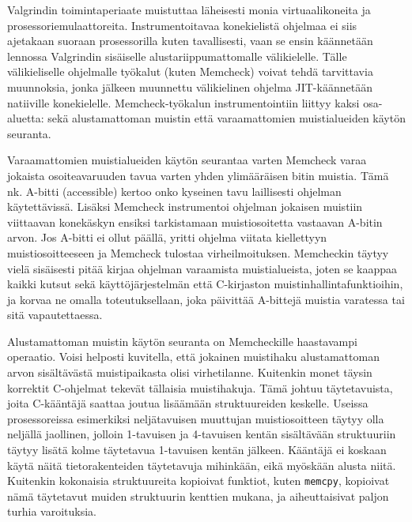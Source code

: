 Valgrindin toimintaperiaate muistuttaa läheisesti monia virtuaalikoneita ja prosessoriemulaattoreita.
Instrumentoitavaa konekielistä ohjelmaa ei siis ajetakaan suoraan prosessorilla kuten tavallisesti,
vaan se ensin käännetään lennossa Valgrindin sisäiselle alustariippumattomalle vä\-li\-kie\-lel\-le.
Tälle vä\-li\-kie\-li\-sel\-le ohjelmalle työkalut (kuten Memcheck) voivat tehdä tarvittavia muunnoksia,
jonka jälkeen muunnettu vä\-li\-kie\-li\-nen ohjelma JIT-käännetään natiiville konekielelle.
Memcheck-työkalun instrumentointiin liittyy kaksi osa-aluetta:
sekä alustamattoman muistin että varaamattomien muistialueiden käytön seuranta.

Varaamattomien muistialueiden käytön seurantaa  varten Memcheck varaa jokaista osoiteavaruuden tavua varten yhden ylimääräisen bitin muistia.
Tämä nk. A-bitti (accessible) kertoo onko kyseinen tavu laillisesti ohjelman käytettävissä.
Lisäksi Memcheck instrumentoi ohjelman jokaisen muistiin viittaavan konekäskyn
ensiksi tarkistamaan muistiosoitetta vastaavan A-bitin arvon.
Jos A-bitti ei ollut päällä,
yritti ohjelma viitata kiellettyyn muistiosoitteeseen ja
Memcheck tulostaa virheilmoituksen.
Memcheckin täytyy vielä sisäisesti pitää kirjaa ohjelman varaamista muistialueista,
joten se kaappaa kaikki kutsut sekä käyttöjärjestelmän että C-kirjaston muistinhallintafunktioihin,
ja korvaa ne omalla toteutuksellaan,
joka päivittää A-bittejä muistia varatessa tai sitä vapautettaessa.

Alustamattoman muistin käytön seuranta on Memcheckille haastavampi operaatio.
Voisi helposti kuvitella,
että jokainen muistihaku alustamattoman arvon sisältävästä muistipaikasta olisi virhetilanne.
Kuitenkin monet täysin korrektit C-ohjelmat tekevät tällaisia muistihakuja.
Tämä johtuu täytetavuista, joita C-kääntäjä saattaa joutua lisäämään struktuureiden keskelle.
Useissa prosessoreissa esimerkiksi neljätavuisen muuttujan muistiosoitteen täytyy olla neljällä jaollinen,
jolloin 1-tavuisen ja 4-tavuisen kentän sisältävään struktuuriin täytyy lisätä kolme täytetavua
1-tavuisen kentän jälkeen.
Kääntäjä ei koskaan käytä näitä tietorakenteiden täytetavuja mihinkään, eikä myöskään alusta niitä.
Kuitenkin kokonaisia struktuureita kopioivat funktiot, kuten \texttt{memcpy},
kopioivat nämä täytetavut muiden struktuurin kenttien mukana,
ja aiheuttaisivat paljon turhia varoituksia.

